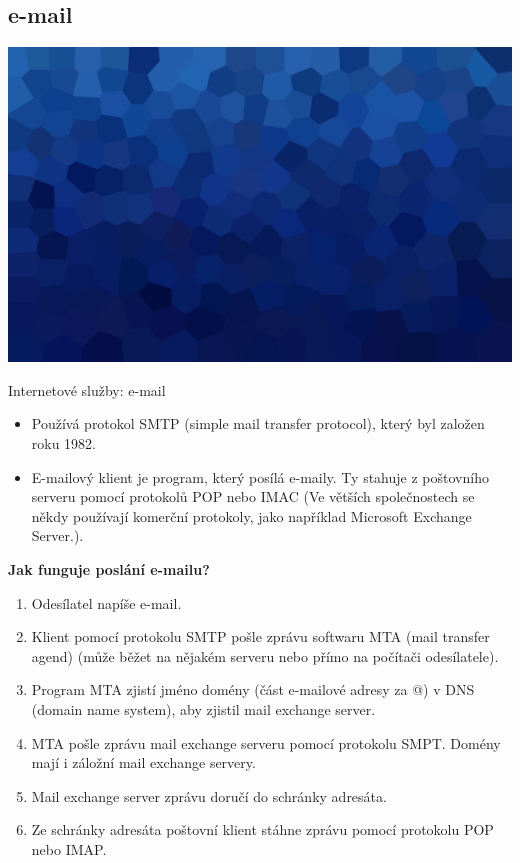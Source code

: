 \documentclass[aspectratio=169,xcolor=dvipsnames, t]{beamer}
\begin{document}
\subsection{e-mail}
{
    \includegraphics[width=\paperwidth,height=\paperheight]{AICStyleData/logos/mene_polygonu_bg.png}
}
\begin{frame}{Internetové služby: e-mail}
\vspace{-0.75cm}
\begin{itemize}
    \item Používá protokol SMTP (simple mail transfer protocol), který byl založen roku 1982.
    \item E-mailový klient je program, který posílá e-maily. Ty stahuje z poštovního serveru pomocí protokolů POP nebo IMAC (Ve větších společnostech se někdy používají komerční protokoly, jako například Microsoft Exchange Server.).
\end{itemize}
\textbf{\large{Jak funguje poslání e-mailu?}}
\begin{enumerate}
    \item Odesílatel napíše e-mail. 
    \item Klient pomocí protokolu SMTP pošle zprávu softwaru MTA (mail transfer agend) (může běžet na nějakém serveru nebo přímo na počítači odesílatele).
    \item Program MTA zjistí jméno domény (část e-mailové adresy za @) v DNS (domain name system), aby zjistil mail exchange server.
    \item MTA pošle zprávu mail exchange serveru pomocí protokolu SMPT. Domény mají i záložní mail exchange servery.
    \item Mail exchange server zprávu doručí do schránky adresáta.
    \item Ze schránky adresáta poštovní klient stáhne zprávu pomocí protokolu POP nebo IMAP. 
\end{enumerate}

\end{frame}
\end{document}
